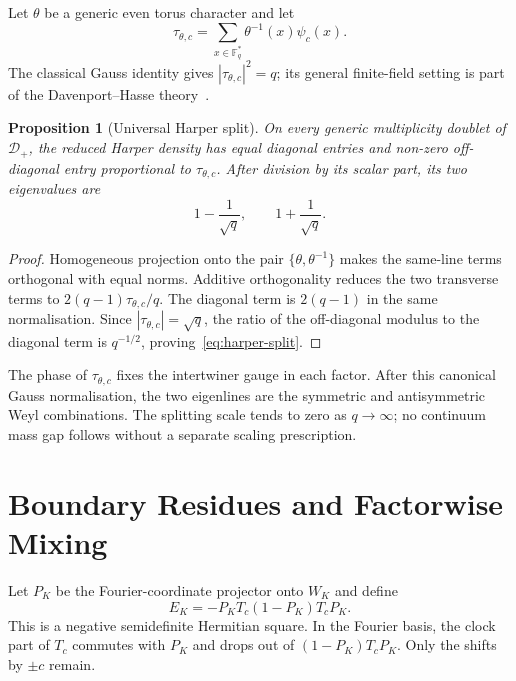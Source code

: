 \documentclass[11pt,a4paper]{article}
\newtheorem{proposition}[theorem]{Proposition}
\theoremstyle{definition}
\theoremstyle{remark}
\newcommand{\Fq}{\mathbb{F}_q}
\newcommand{\Dplus}{\mathcal{D}_{+}}
\begin{document}
Let $\theta$ be a generic even torus character and let
\begin{equation}
  \tau_{\theta,c}
  =\sum_{x\in\Fq^*}\theta^{-1}(x)\psi_c(x).
  \label{eq:gauss-sum}
\end{equation}
The classical Gauss identity gives $|\tau_{\theta,c}|^2=q$; its general finite-field
setting is part of the Davenport--Hasse theory~\cite{DavenportHasse1935}.

\begin{proposition}[Universal Harper split]
  \label{prop:harper-split}
  On every generic multiplicity doublet of $\Dplus$, the reduced Harper density has equal
  diagonal entries and non-zero off-diagonal entry proportional to
  $\tau_{\theta,c}$.
  After division by its scalar part, its two eigenvalues are
  \begin{equation}
    1-\frac{1}{\sqrt q},
    \qquad
    1+\frac{1}{\sqrt q}.
    \label{eq:harper-split}
  \end{equation}
\end{proposition}

\begin{proof}
  Homogeneous projection onto the pair
  $\{\theta,\theta^{-1}\}$ makes the same-line terms orthogonal with equal norms.
  Additive orthogonality reduces the two transverse terms to
  $2(q-1)\tau_{\theta,c}/q$.
  The diagonal term is $2(q-1)$ in the same normalisation.
  Since $|\tau_{\theta,c}|=\sqrt q$, the ratio of the off-diagonal modulus to the diagonal
  term is $q^{-1/2}$, proving~\eqref{eq:harper-split}.
\end{proof}

The phase of $\tau_{\theta,c}$ fixes the intertwiner gauge in each factor.
After this canonical Gauss normalisation, the two eigenlines are the symmetric and
antisymmetric Weyl combinations.
The splitting scale tends to zero as $q\to\infty$; no continuum mass gap follows without a
separate scaling prescription.

\section{Boundary Residues and Factorwise Mixing}
\label{sec:boundary}

Let $P_K$ be the Fourier-coordinate projector onto $W_K$ and define
\begin{equation}
  E_K=-P_KT_c(1-P_K)T_cP_K.
  \label{eq:residue}
\end{equation}
This is a negative semidefinite Hermitian square.
In the Fourier basis, the clock part of $T_c$ commutes with $P_K$ and drops out of
$(1-P_K)T_cP_K$.
Only the shifts by $\pm c$ remain.
\end{document}
